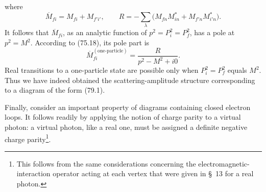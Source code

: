 where
\[
\overline M_{fi}=M_{fi}+M_{f'i'},
\qquad
R=-\sum_\lambda\bigl(M_{fn}M_{in}^*+M_{f'n}M_{i'n}^*\bigr).
\]
It follows that $\overline M_{fi}$, as an analytic function of $p^2=P_i^2=P_f^2$, has a pole at $p^2=M^2$. According to (75.18), its pole part is
\begin{equation}
\overline M_{fi}^{(\text{one-particle})}
=\frac{R}{p^2-M^2+i0}.
\tag{79.5}
\end{equation}
Real transitions to a one-particle state are possible only when $P_i^2=P_f^2$ equals $M^2$. Thus we have indeed obtained the scattering-amplitude structure corresponding to a diagram of the form (79.1).

Finally, consider an important property of diagrams containing closed electron loops. It follows readily by applying the notion of charge parity to a virtual photon: a virtual photon, like a real one, must be assigned a definite negative charge parity\footnote{This follows from the same considerations concerning the electromagnetic-interaction operator acting at each vertex that were given in \S~13 for a real photon.}.

